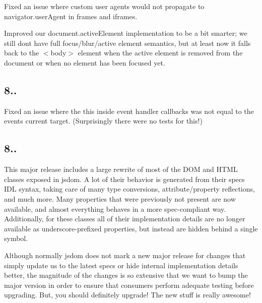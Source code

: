 \begin{DoxyItemize}
\item Fixed an issue where custom user agents would not propagate to {\ttfamily navigator.\+user\+Agent} in frames and iframes.
\item Improved our {\ttfamily document.\+active\+Element} implementation to be a bit smarter; we still don\textquotesingle{}t have full focus/blur/active element semantics, but at least now it falls back to the {\ttfamily $<$body$>$} element when the active element is removed from the document or when no element has been focused yet.
\end{DoxyItemize}

\subsection*{8..}


\begin{DoxyItemize}
\item Fixed an issue where the {\ttfamily this} inside event handler callbacks was not equal to the event\textquotesingle{}s current target. (Surprisingly there were no tests for this!)
\end{DoxyItemize}

\subsection*{8..}

This major release includes a large rewrite of most of the D\+OM and H\+T\+ML classes exposed in jsdom. A lot of their behavior is generated from their specs\textquotesingle{} I\+DL syntax, taking care of many type conversions, attribute/property reflections, and much more. Many properties that were previously not present are now available, and almost everything behaves in a more spec-\/compliant way. Additionally, for these classes all of their implementation details are no longer available as underscore-\/prefixed properties, but instead are hidden behind a single symbol.

Although normally jsdom does not mark a new major release for changes that simply update us to the latest specs or hide internal implementation details better, the magnitude of the changes is so extensive that we want to bump the major version in order to ensure that consumers perform adequate testing before upgrading. But, you should definitely upgrade! The new stuff is really awesome!


